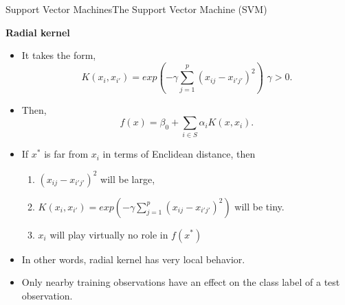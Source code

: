 \begin{frame}{Support Vector Machines}{The Support Vector Machine (SVM)}


\textbf{Radial kernel} \pause 

\begin{itemize}
    \item It takes the form, \pause 
    \begin{equation}
         K(x_i, x_{i'}) = exp ( -\gamma \sum_{j=1}^p    (x_{ij} - x_{i'j'})^2   ) \, \, \gamma > 0. 
    \end{equation} \pause
    \item Then,  \pause 
    \begin{equation*}
                 f(x) = \beta_0 + \sum_{i \in S} \alpha_i K(x, x_{i}).
    \end{equation*} \pause 
    \item If $x^\ast$ is far from $x_i$ in terms of Enclidean distance, then \pause 

    \begin{enumerate}
        \item $(x_{ij} - x_{i'j'})^2$ will be large, \pause 
        \item $K(x_i, x_{i'}) = exp ( -\gamma \sum_{j=1}^p    (x_{ij} - x_{i'j'})^2 )$ will be tiny. \pause 
        \item $x_i$ will play virtually no role in $f(x^\ast)$ \pause 
    \end{enumerate}
    
    \item In other words, radial kernel has very local behavior. \pause 
    \item Only nearby training observations have an eﬀect on the class label of a test observation.
\end{itemize}



\end{frame}

